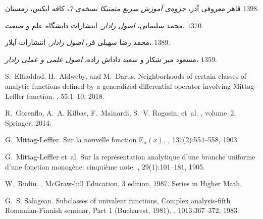 
\begin{thebibliography}{10}
\persian
{}
قاهر معروفی آذر،
\newblock \textit{جزوه‌ی آموزش سریع متمتیکا نسخه‌ی 7،} 
\newblock 
کافه ایکس، زمستان
$1398$.

محمد سلیمانی،
\newblock \textit{اصول رادار,} 
\newblock 
انتشارات دانشگاه علم و صنعت،
$1370$.

محمد رضا سهیلی فر،
\newblock \textit{اصول رادار,} 
\newblock 
انتشارات آیلار،
$1389$.

مسعود میر شکار و سعید داداش زاده،
\newblock \textit{اصول علمی و عملی رادار،} 
\newblock $1359$.

\latin
{}
S.~Elhaddad, H.~Aldweby, and M.~Darus.
\newblock Neighborhoods of certain classes of analytic functions defined by a
  generalized differential operator involving {Mittag-Leffler} function.
, 55:1--10,
  2018.

R.~Gorenflo, A.~A. Kilbas, F.~Mainardi, S.~V. Rogosin, et~al.
,
  volume~2.
\newblock Springer, 2014.

G.~Mittag-Leffler.
\newblock Sur la nouvelle fonction {E$_\alpha(x)$}.
, 137(2):554--558, 1903.

G.~Mittag-Leffler et~al.
\newblock Sur la repr{\'e}sentation analytique d’une branche uniforme d’une
  fonction monog{\`e}ne: cinqui{\`e}me note.
, 29(1):101--181, 1905.

W.~Rudin.
.
\newblock McGraw-hill Education, 3 edition, 1987.
\newblock Series in Higher Math.

G.~S. Salagean.
\newblock Subclasses of univalent functions, {Complex analysis-fifth
  Romanian-Finnish seminar, Part 1} ({Bucharest}, 1981).
, 1013:367--372, 1983.

\end{thebibliography}
\persian